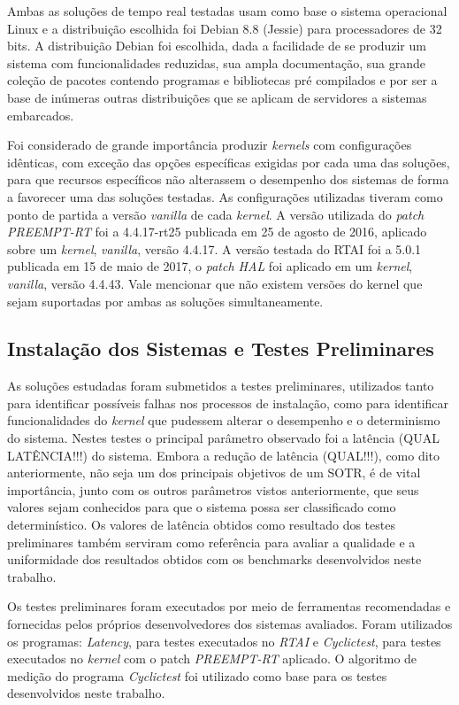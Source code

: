 Ambas as soluções de tempo real testadas usam como base o sistema operacional Linux e a distribuição escolhida foi Debian 8.8 (Jessie) para processadores de 32 bits. A distribuição Debian foi escolhida, dada a facilidade de se produzir um sistema com funcionalidades reduzidas, sua ampla documentação, sua grande coleção de pacotes contendo programas e bibliotecas pré compilados e por ser a base de inúmeras outras distribuições que se aplicam de servidores a sistemas embarcados. 

Foi considerado de grande importância produzir \textit{kernels} com configurações idênticas, com exceção das opções específicas exigidas por cada uma das soluções, para que recursos específicos não alterassem o desempenho dos sistemas de forma a favorecer uma das soluções testadas. As configurações utilizadas tiveram como ponto de partida a versão \textit{vanilla} de cada \textit{kernel}. A versão utilizada do \textit{patch PREEMPT-RT} foi a 4.4.17-rt25 publicada em 25 de agosto de 2016, aplicado sobre um \textit{kernel}, \textit{vanilla}, versão 4.4.17. A versão testada do RTAI foi a 5.0.1 publicada em 15 de maio de 2017, o \textit{patch HAL} foi aplicado em um \textit{kernel}, \textit{vanilla}, versão 4.4.43. Vale mencionar que não existem versões do kernel que sejam suportadas por ambas as soluções simultaneamente.

\subsection{Instalação dos Sistemas e Testes Preliminares}
As soluções estudadas foram submetidos a testes preliminares, utilizados tanto para identificar possíveis falhas nos processos de instalação, como para identificar funcionalidades do \textit{kernel} que pudessem alterar o desempenho e o determinismo do sistema. Nestes testes o principal parâmetro observado foi a latência (QUAL LATÊNCIA!!!) do sistema. Embora a redução de latência (QUAL!!!), como dito anteriormente, não seja um dos principais objetivos de um SOTR, é de vital importância, junto com os outros parâmetros vistos anteriormente, que seus valores sejam conhecidos para que o sistema possa ser classificado como determinístico. Os valores de latência obtidos como resultado dos testes preliminares também serviram como referência para avaliar a qualidade e a uniformidade dos resultados obtidos com os benchmarks desenvolvidos neste trabalho.

Os testes preliminares foram executados por meio de ferramentas recomendadas e fornecidas pelos próprios desenvolvedores dos sistemas avaliados. Foram utilizados os programas: \textit{Latency}, para testes executados no \textit{RTAI} e \textit{Cyclictest}, para testes executados no \textit{kernel} com o patch \textit{PREEMPT-RT} aplicado. O algoritmo de medição do programa \textit{Cyclictest} foi utilizado como base para os testes desenvolvidos neste trabalho.

